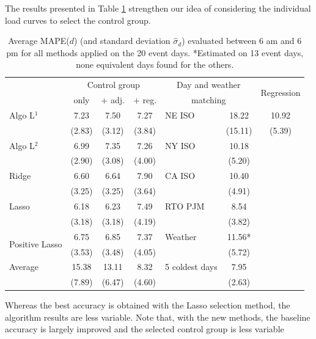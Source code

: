 \documentclass[journal]{IEEEtran}
\begin{document}
The results presented in Table \ref{tab:res} strengthen our idea 
of considering the individual load curves 
to select the control group. 
\renewcommand{\arraystretch}{1.3}
\begin{table}[!h]
\caption{{\scriptsize Average MAPE($d$) (and standard deviation $\hat{\sigma}_d$) evaluated 
between 6 am and 6 pm for all methods applied on the 20 event days. *Estimated on 13 
event days, none equivalent days found for the others.}}
\label{tab:res}
\centering
\begin{scriptsize}
\begin{tabular}{l|c|c|c|l|c|c}
\hline
 & \multicolumn{3}{c|}{Control group} & \multicolumn{2}{c|}{Day and weather} & \multirow{2}{*}{Regression}  \\
 \cline{2-4}
 & only & + adj. & + reg. & \multicolumn{2}{c|}{ matching} & \\
\hline
Algo L$^1$    		  & 7.23   &    7.50   &  7.27  & NE ISO    & 18.22  & 10.92 \\
					  & (2.83) &   (3.12)  & (3.84)	&			& (15.11)& (5.39)\\		
Algo L$^2$    		  & 6.99   &    7.35   &  7.26  & NY ISO    & 10.18  &       \\
					  & (2.90) &   (3.08)  & (4.00) &			& (5.20) & 		 \\	
Ridge  				  & 6.60   &    6.64   &  7.90  & CA ISO    & 10.40  &       \\
					  & (3.25) &   (3.25)  & (3.64)	&       	& (4.91) & 		 \\	
Lasso     			  & 6.18   &    6.23   &  7.49  & RTO PJM   & 8.54   &       \\
					  & (3.18) &   (3.18)  & (4.19)	&			& (3.82) & 		 \\	
\multirow{2}{1cm}{Positive Lasso}  		   & 6.75   &    6.85   &  7.37  & Weather   & 11.56* &       \\ 
				  	  & (3.53) &   (3.48)  & (4.05) &			& (5.72) & 		 \\	  
Average			  	  & 15.38  & 13.11     & 8.32   &  5 coldest days   & 7.95   &       \\
         			  & (7.89) &   (6.47)  & (4.60) &           & (2.63) &       \\
\hline
\end{tabular}
\end{scriptsize}
\end{table}
Whereas the best accuracy is obtained with the Lasso selection 
method, the algorithm results are less variable. Note that, with the new methods, 
the baseline accuracy is largely improved and the selected control group is less variable 
\end{document}
